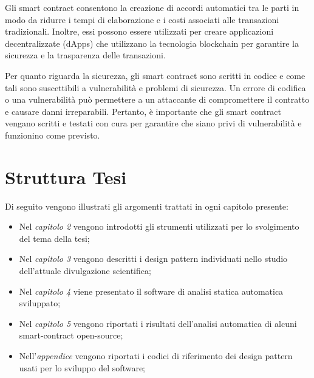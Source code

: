 Gli smart contract consentono la creazione di accordi automatici tra le parti in modo da ridurre i tempi di elaborazione e i costi associati alle transazioni tradizionali. Inoltre, essi possono essere utilizzati per creare applicazioni decentralizzate (dApps) che utilizzano la tecnologia blockchain per garantire la sicurezza e la trasparenza delle transazioni.

Per quanto riguarda la sicurezza, gli smart contract sono scritti in codice e come tali sono suscettibili a vulnerabilità e problemi di sicurezza. Un errore di codifica o una vulnerabilità può permettere a un attaccante di compromettere il contratto e causare danni irreparabili. Pertanto, è importante che gli smart contract vengano scritti e testati con cura per garantire che siano privi di vulnerabilità e funzionino come previsto.

\section{Struttura Tesi}
Di seguito vengono illustrati gli argomenti trattati in ogni capitolo presente:
\begin{itemize}
	\item Nel \textit{capitolo 2} vengono introdotti gli strumenti utilizzati per lo svolgimento del tema della tesi;
	\item Nel \textit{capitolo 3} vengono descritti i design pattern individuati nello studio dell'attuale divulgazione scientifica;
	\item Nel \textit{capitolo 4} viene presentato il software di analisi statica automatica sviluppato;
	\item Nel \textit{capitolo 5} vengono riportati i risultati dell'analisi automatica di alcuni smart-contract open-source;
	\item Nell'\textit{appendice} vengono riportati i codici di riferimento dei design pattern usati per lo sviluppo del software;
\end{itemize}